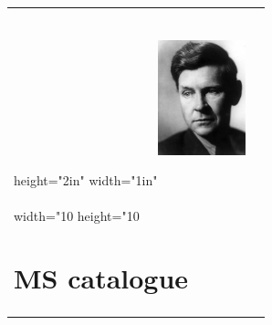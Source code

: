 \documentclass[11pt,twoside]{article}\makeatletter
\makeatletter
\renewcommand\section{\@startsection {section}{1}{\z@}%
     {-1.75ex \@plus -0.5ex \@minus -.2ex}%
     {0.5ex \@plus .2ex}%
     {\reset@font\Large\bfseries\sffamily}}
\def\DivI{\section}
\def\DivI{\chapter}
\makeatother
\begin{document}
\begin{longtable}{P{0.19558457711442787\textwidth}P{0.6544154228855721\textwidth}}
height="2in" width="1in"\tabcellsep \noindent\includegraphics[width=1in,height=2in,]{portrait.jpg}\\
width="10%
height="10%
 
\DivI[MS catalogue]{MS catalogue}

\end{longtable}
\end{document}
